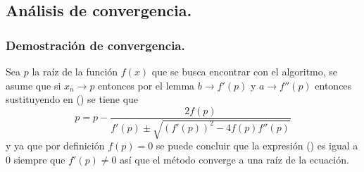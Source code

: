 \subsection{Análisis de convergencia.}
\subsubsection{Demostración de convergencia.}
Sea $p$ la raíz de la función $f(x)$ que se busca encontrar con el algoritmo,
se asume que si $x_n \rightarrow p$ entonces por el lemma  $b \rightarrow f'(p)$
y $a \rightarrow f''(p)$ entonces sustituyendo en () se tiene que
\begin{equation}
    \label{muller_convergence_eq}
    p = p - \frac{2f(p)}{f'(p)\pm\sqrt{\left(f'(p)\right)^2-4f(p)f''(p)}}
\end{equation}
y ya que por definición $f(p)=0$ se puede concluir que la expresión ()
es igual a $0$ siempre que $f'(p) \neq 0$ así que el método converge a una raíz de la ecuación.
